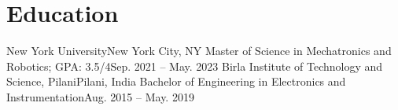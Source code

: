\section{Education}
  \resumeSubHeadingListStart
    \resumeSubheading
      {New York University}{New York City, NY}
      {Master of Science in Mechatronics and Robotics;  GPA: 3.5/4}{Sep. 2021 -- May. 2023}
    \resumeSubheading
      {Birla Institute of Technology and Science, Pilani}{Pilani, India}
      {Bachelor of Engineering in Electronics and Instrumentation}{Aug. 2015 -- May. 2019}
  \resumeSubHeadingListEnd